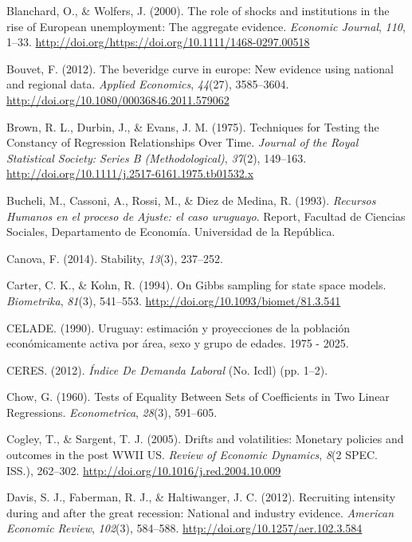 \documentclass[12pt,oneside]{reedthesis}
\begin{document}
\leavevmode\hypertarget{ref-Blanchard2000}{}%
Blanchard, O., \& Wolfers, J. (2000). The role of shocks and institutions in the rise of European unemployment: The aggregate evidence. \emph{Economic Journal}, \emph{110}, 1--33. \url{http://doi.org/https://doi.org/10.1111/1468-0297.00518}

\leavevmode\hypertarget{ref-Bouvet2012}{}%
Bouvet, F. (2012). The beveridge curve in europe: New evidence using national and regional data. \emph{Applied Economics}, \emph{44}(27), 3585--3604. \url{http://doi.org/10.1080/00036846.2011.579062}

\leavevmode\hypertarget{ref-Brown1975}{}%
Brown, R. L., Durbin, J., \& Evans, J. M. (1975). Techniques for Testing the Constancy of Regression Relationships Over Time. \emph{Journal of the Royal Statistical Society: Series B (Methodological)}, \emph{37}(2), 149--163. \url{http://doi.org/10.1111/j.2517-6161.1975.tb01532.x}

\leavevmode\hypertarget{ref-DECON1993}{}%
Bucheli, M., Cassoni, A., Rossi, M., \& Diez de Medina, R. (1993). \emph{Recursos Humanos en el proceso de Ajuste: el caso uruguayo}. Report, Facultad de Ciencias Sociales, Departamento de Economía. Universidad de la República.

\leavevmode\hypertarget{ref-Canova1995}{}%
Canova, F. (2014). Stability, \emph{13}(3), 237--252.

\leavevmode\hypertarget{ref-KarterKohn1994}{}%
Carter, C. K., \& Kohn, R. (1994). On Gibbs sampling for state space models. \emph{Biometrika}, \emph{81}(3), 541--553. \url{http://doi.org/10.1093/biomet/81.3.541}

\leavevmode\hypertarget{ref-Celade1990}{}%
CELADE. (1990). Uruguay: estimación y proyecciones de la población económicamente activa por área, sexo y grupo de edades. 1975 - 2025.

\leavevmode\hypertarget{ref-Ceres2012}{}%
CERES. (2012). \emph{Índice De Demanda Laboral} (No. Icdl) (pp. 1--2).

\leavevmode\hypertarget{ref-Chow1960}{}%
Chow, G. (1960). Tests of Equality Between Sets of Coefficients in Two Linear Regressions. \emph{Econometrica}, \emph{28}(3), 591--605.

\leavevmode\hypertarget{ref-Cogley2005}{}%
Cogley, T., \& Sargent, T. J. (2005). Drifts and volatilities: Monetary policies and outcomes in the post WWII US. \emph{Review of Economic Dynamics}, \emph{8}(2 SPEC. ISS.), 262--302. \url{http://doi.org/10.1016/j.red.2004.10.009}

\leavevmode\hypertarget{ref-Haltiwanger2012}{}%
Davis, S. J., Faberman, R. J., \& Haltiwanger, J. C. (2012). Recruiting intensity during and after the great recession: National and industry evidence. \emph{American Economic Review}, \emph{102}(3), 584--588. \url{http://doi.org/10.1257/aer.102.3.584}
\end{document}
